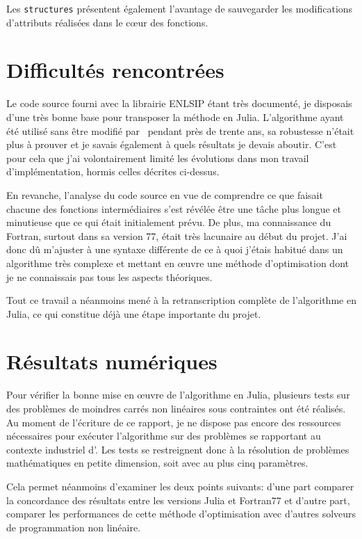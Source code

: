 Les \texttt{structures} présentent également l'avantage de sauvegarder les modifications d'attributs réalisées dans le c\oe ur des fonctions. 

\section{Difficultés rencontrées}

Le code source fourni avec la librairie ENLSIP étant très documenté, je disposais d'une très bonne base pour transposer la méthode en Julia. L'algorithme ayant été 
utilisé sans être modifié par \HQ\ pendant près de trente ans, sa robustesse n'était plus à prouver et je savais également à quels résultats je devais aboutir.
C'est pour cela que j'ai volontairement limité les évolutions dans mon travail d'implémentation, hormis celles décrites ci-dessus. 

En revanche, l'analyse du code source en vue de comprendre ce que faisait chacune des fonctions intermédiaires s'est révélée être une tâche plus longue et minutieuse
que ce qui était initialement prévu. De plus, ma connaissance du Fortran, surtout dans sa version 77, était très lacunaire au début du projet. J'ai donc dû m'ajuster 
à une syntaxe différente de ce à quoi j'étais habitué dans un algorithme très complexe et mettant en \oe uvre une méthode d'optimisation dont je ne connaissais
pas tous les aspects théoriques.

Tout ce travail a néanmoins mené à la retranscription complète de l'algorithme en Julia, ce qui constitue déjà une étape importante du projet.


\section{Résultats numériques}\label{implementation:resultats}

Pour vérifier la bonne mise en \oe uvre de l'algorithme en Julia, plusieurs tests sur des problèmes de moindres carrés non linéaires sous contraintes ont été réalisés.
Au moment de l'écriture de ce rapport, je ne dispose pas encore des ressources nécessaires pour exécuter l'algorithme sur des problèmes se rapportant au contexte 
industriel d'\HQ. Les tests se restreignent donc à la résolution de problèmes mathématiques en petite dimension, soit avec au plus cinq paramètres.

Cela permet néanmoins d'examiner les deux points suivants: d'une part comparer la concordance des résultats entre les versions Julia et Fortran77 et d'autre part, comparer les performances
de cette méthode d'optimisation avec d'autres solveurs de programmation non linéaire. 

